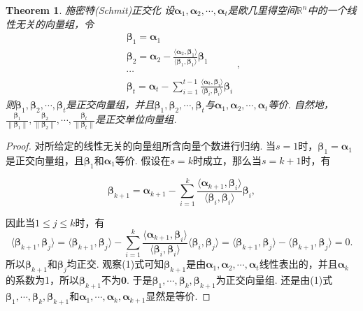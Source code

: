 \documentclass{article}
\newtheorem{theorem}{Theorem}[section]
\newcommand{\norm}[1]{\left\lVert#1\right\rVert} %
\newcommand{\mbf}[1]{\bm{#1}}
\newcommand\inp[2]{\langle #1, #2 \rangle} %
\begin{document}
\begin{theorem}
\rm {\color{red}施密特(Schmit)正交化} 设$\mbf{\alpha}_1,\mbf{\alpha}_2,\cdots,\mbf{\alpha}_t$是欧几里得空间$\mathbb{R}^n$中的一个线性无关的向量组，令
$$
\begin{array}{ll}
\mbf{\beta}_1 = \mbf{\alpha}_1 \\
\mbf{\beta}_2 = \mbf{\alpha}_2 - \frac{\inp{\mbf{\alpha}_2}{\mbf{\beta}_1}}{\inp{\mbf{\beta}_1}{\mbf{\beta}_1}}\mbf{\beta}_1\\
\cdots \\
\mbf{\beta}_t = \mbf{\alpha}_t - \sum\limits_{i = 1}^{t-1}\frac{\inp{\mbf{\alpha}_t}{\mbf{\beta}_i}}{\inp{\mbf{\beta}_i}{\mbf{\beta}_i}}\mbf{\beta}_i
\end{array},
$$
则$\mbf{\beta}_1,\mbf{\beta}_2,\cdots,\mbf{\beta}_t$是正交向量组，并且$\mbf{\beta}_1,\mbf{\beta}_2,\cdots,\mbf{\beta}_t$与$\mbf{\alpha}_1,\mbf{\alpha}_2,\cdots,\mbf{\alpha}_t$等价. 自然地，$\frac{\mbf{\beta}_1}{\norm{\mbf{\beta}_1}},\frac{\mbf{\beta}_2}{\norm{\mbf{\beta}_2}},\cdots,\frac{\mbf{\beta}_t}{\norm{\mbf{\beta}_t}}$是正交单位向量组.
\end{theorem}

\begin{proof}
对所给定的线性无关的向量组所含向量个数进行归纳. 当$s = 1$时，$\mbf{\beta}_1 = \mbf{\alpha}_1$是正交向量组，且$\mbf{\beta}_1$和$\mbf{\alpha}_1$等价. 假设在$s = k$时成立，那么当$s = k+1$时，有

\begin{equation}
\mbf{\beta}_{k+1} = \mbf{\alpha}_{k+1} - \sum\limits_{i = 1}^{k}\frac{\inp{\mbf{\alpha}_{k+1}}{\mbf{\beta}_i}}{\inp{\mbf{\beta}_i}{\mbf{\beta}_i}}\mbf{\beta}_i,
\end{equation}

因此当$1\leq j \leq k$时，有
$$
\inp{\mbf{\beta}_{k+1}}{\mbf{\beta}_{j}} = \inp{\mbf{\beta}_{k+1}}{\mbf{\beta}_{j}}-\sum\limits_{i = 1}^{k}\frac{\inp{\mbf{\alpha}_{k+1}}{\mbf{\beta}_i}}{\inp{\mbf{\beta}_i}{\mbf{\beta}_i}}\inp{\mbf{\beta}_i}{\mbf{\beta}_j} = \inp{\mbf{\beta}_{k+1}}{\mbf{\beta}_{j}} - \inp{\mbf{\beta}_{k+1}}{\mbf{\beta}_{j}} = 0.
$$
所以$\mbf{\beta}_{k+1}$和$\mbf{\beta}_{j}$均正交. 观察(1)式可知$\mbf{\beta}_{k+1}$是由$\mbf{\alpha}_1,\mbf{\alpha}_2,\cdots,\mbf{\alpha}_t$线性表出的，并且$\mbf{\alpha}_k$的系数为1，所以$\mbf{\beta}_{k+1}$不为$\mbf{0}$. 于是$\mbf{\beta}_{1},\cdots,\mbf{\beta}_{k},\mbf{\beta}_{k+1}$为正交向量组. 还是由(1)式$\mbf{\beta}_{1},\cdots,\mbf{\beta}_{k},\mbf{\beta}_{k+1}$和$\mbf{\alpha}_{1},\cdots,\mbf{\alpha}_{k},\mbf{\alpha}_{k+1}$显然是等价.
\end{proof}
\end{document}
